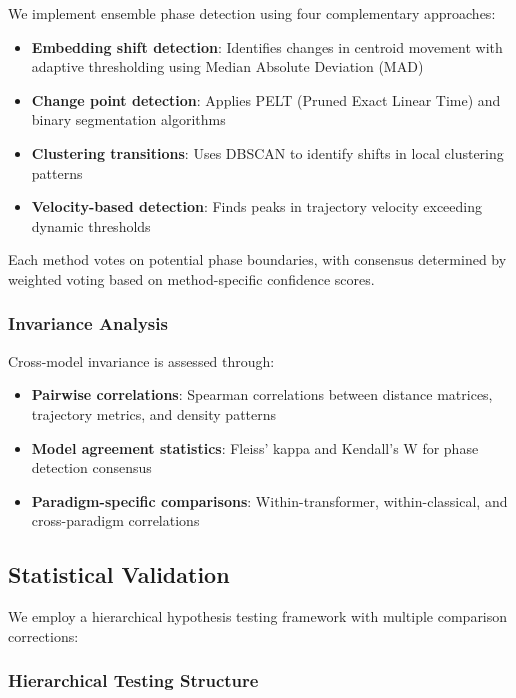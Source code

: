 \documentclass[11pt,letterpaper]{article}
\begin{document}
We implement ensemble phase detection using four complementary approaches:
\begin{itemize}
\item \textbf{Embedding shift detection}: Identifies changes in centroid movement with adaptive thresholding using Median Absolute Deviation (MAD)
\item \textbf{Change point detection}: Applies PELT (Pruned Exact Linear Time) and binary segmentation algorithms
\item \textbf{Clustering transitions}: Uses DBSCAN to identify shifts in local clustering patterns
\item \textbf{Velocity-based detection}: Finds peaks in trajectory velocity exceeding dynamic thresholds
\end{itemize}

Each method votes on potential phase boundaries, with consensus determined by weighted voting based on method-specific confidence scores.

\subsubsection{Invariance Analysis}

Cross-model invariance is assessed through:
\begin{itemize}
\item \textbf{Pairwise correlations}: Spearman correlations between distance matrices, trajectory metrics, and density patterns
\item \textbf{Model agreement statistics}: Fleiss' kappa and Kendall's W for phase detection consensus
\item \textbf{Paradigm-specific comparisons}: Within-transformer, within-classical, and cross-paradigm correlations
\end{itemize}

\subsection{Statistical Validation}

We employ a hierarchical hypothesis testing framework with multiple comparison corrections:

\subsubsection{Hierarchical Testing Structure}
\end{document}
